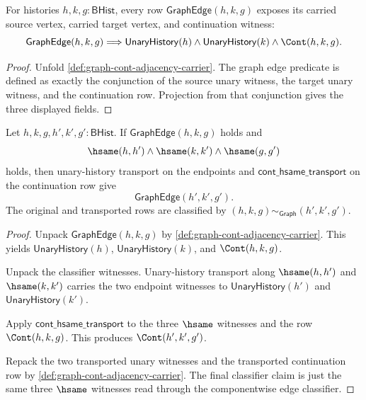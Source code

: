 \begin{theorem}
\label{thm:graph-cont-edge-endpoint-coverage}
For histories $h,k,g:\mathsf{BHist}$, every row
$\mathsf{GraphEdge}(h,k,g)$ exposes its carried source vertex, carried target
vertex, and continuation witness:
$$
\mathsf{GraphEdge}(h,k,g)
\Longrightarrow
\mathsf{UnaryHistory}(h)\land
\mathsf{UnaryHistory}(k)\land
\Cont(h,k,g).
$$
\end{theorem}
\begin{proof}
Unfold \autoref{def:graph-cont-adjacency-carrier}. The graph edge predicate is
defined as exactly the conjunction of the source unary witness, the target
unary witness, and the continuation row. Projection from that conjunction gives
the three displayed fields.
\end{proof}

\begin{theorem}
\label{thm:graph-cont-edge-classifier-transport}
Let $h,k,g,h',k',g':\mathsf{BHist}$. If
$\mathsf{GraphEdge}(h,k,g)$ holds and
$$
\hsame(h,h')\land
\hsame(k,k')\land
\hsame(g,g')
$$
holds, then unary-history transport on the endpoints and
$\mathsf{cont\_hsame\_transport}$ on the continuation row give
$$
\mathsf{GraphEdge}(h',k',g').
$$
The original and transported rows are classified by
$(h,k,g)\sim_{\mathsf{Graph}}(h',k',g')$.
\end{theorem}
\begin{proof}
Unpack $\mathsf{GraphEdge}(h,k,g)$ by
\autoref{def:graph-cont-adjacency-carrier}. This yields
$\mathsf{UnaryHistory}(h)$, $\mathsf{UnaryHistory}(k)$, and $\Cont(h,k,g)$.

Unpack the classifier witnesses. Unary-history transport along $\hsame(h,h')$
and $\hsame(k,k')$ carries the two endpoint witnesses to
$\mathsf{UnaryHistory}(h')$ and $\mathsf{UnaryHistory}(k')$.

Apply $\mathsf{cont\_hsame\_transport}$ to the three $\hsame$ witnesses and the
row $\Cont(h,k,g)$. This produces $\Cont(h',k',g')$.

Repack the two transported unary witnesses and the transported continuation
row by \autoref{def:graph-cont-adjacency-carrier}. The final classifier claim
is just the same three $\hsame$ witnesses read through the componentwise edge
classifier.
\end{proof}

